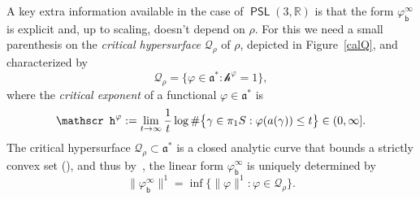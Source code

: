 \documentclass[AHL,Unicode,longabstracts,MathTools]{cedram}
\newcommand{\cartan}{a}
\DeclareMathOperator{\PSL}{{\mathsf{PSL}}}
\newcommand{\scr}{\mathscr}
\newcommand{\hC}[1]{{\scr h}^{#1}}
\renewcommand{\sf}[1]{{\mathsf{#1}}}
\renewcommand{\flat}{\sf{b}}
\newcommand{\calQ}{\mathcal{Q}}
\newcommand{\R}{\mathbb{R}}
\newcommand{\g}{\gamma}
\newcommand{\piS}{\pi_1S}
\renewcommand{\/}{\backslash}
\newcommand{\<}{\langle}
\renewcommand{\>}{\rangle}
\renewcommand{\a}{\mathfrak{a}}
\renewcommand*{\to}{\mathchoice{\longrightarrow}{\rightarrow}{\rightarrow}{\rightarrow}}
\begin{document}
A key extra information available in the case of $\PSL(3,\R)$ is that the form $\varphi^\infty_\flat$ is explicit and, up to scaling, doesn't depend on $\rho$. For this we need a small parenthesis on the \emph{critical hypersurface} $\calQ_\rho$ of $\rho$, depicted in Figure~\ref{calQ},
and characterized by
\[
\calQ_\rho=\bigl\{\varphi\in\a^*: \hC\varphi =1\bigr\},
\]
where the \emph{critical exponent} of a functional $\varphi\in\a^*$ is
\[
\hC\varphi:=\lim_{t\to\infty}\frac1t\log\#\bigl\{\g\in\piS:\varphi(\cartan(\g))\leq t\bigr\}\in(0,\infty].
\]
The critical hypersurface $\calQ_\rho\subset\a^*$ is a closed analytic curve that bounds a strictly convex set (\cite{exponentecritico,exponential}),
and thus by~\cite{Quint-Div}, the linear form $\varphi^\infty_\flat$ is uniquely determined by
\begin{equation}\label{vi=norm}
\|\varphi^\infty_\flat\|^1=\inf\big\{\|\varphi\|^1:\varphi\in\calQ_\rho\big\}.
\end{equation}
\end{document}
